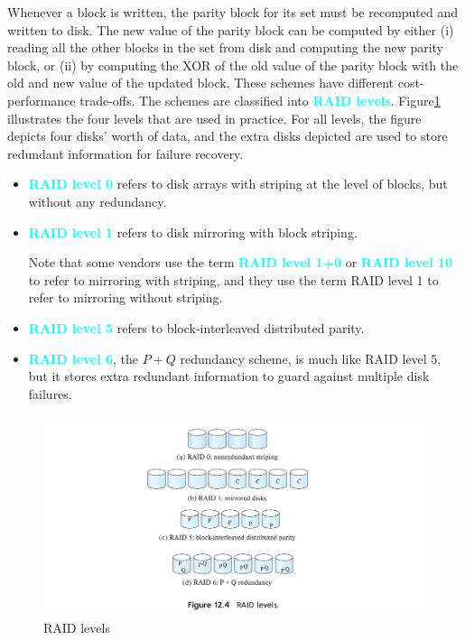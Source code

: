 \documentclass[a4paper,12pt,twoside,openany]{book}
\newcommand{\textcy}[1]{\textbf{\textcolor{cyan}{#1}}}
\begin{document}
Whenever a block is written, the parity block for its set must be recomputed and written to disk. The new value of the parity block can be computed by either (i) reading all the other blocks in the set from disk and computing the new parity block, or (ii) by computing the XOR of the old value of the parity block with the old and new value of the updated block. These schemes have different cost-performance trade-offs. The schemes are classified into \textcy{RAID levels}. Figure\;\ref{Figure:12.4} illustrates the four levels that are used in practice. For all levels, the figure depicts four disks’ worth of data, and the extra disks depicted are used to store redundant information for failure recovery.
\begin{itemize}
    \item \textcy{RAID level 0} refers to disk arrays with striping at the level of blocks, but without any redundancy.
    \item \textcy{RAID level 1} refers to disk mirroring with block striping.
    
    Note that some vendors use the term \textcy{RAID level 1+0} or \textcy{RAID level 10} to refer to mirroring with striping, and they use the term RAID level 1 to refer to mirroring without striping.
    \item \textcy{RAID level 5} refers to block-interleaved distributed parity.
    \item \textcy{RAID level 6}, the $P+Q$ redundancy scheme, is much like RAID level 5, but it stores extra redundant information to guard against multiple disk failures.
\end{itemize}

\begin{figure}[htbp]
    \centering
    \includegraphics[width=\linewidth]{Figure12.4.png}
    \caption{RAID levels}
    \label{Figure:12.4}
\end{figure}
\end{document}
